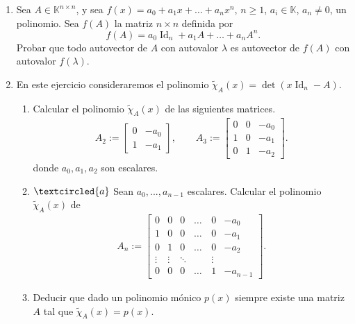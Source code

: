 \begin{enumerate}[resume,topsep=6pt,itemsep=.4cm]


\item Sea $A\in\mathbb{K}^{n\times n}$, y sea $f(x) = a_0 + a_1 x + \dots + a_nx^n$, $n \geq 1$, $a_i\in\mathbb{K}$, $a_n \neq 0$, un polinomio. Sea $f(A)$ la matriz $n \times n$ definida por
$$f(A) = a_0 \operatorname{Id}_n + a_1 A + \dots + a_n A^n.$$
Probar que todo autovector de $A$ con autovalor $\lambda$ es autovector de $f(A)$ con autovalor $f(\lambda)$.


\item\label{caracteristico-otro} {En este ejercicio consideraremos el polinomio $\tilde\chi_A(x)=\det(x\operatorname{Id}_n-A)$.}

\begin{enumerate}
\item  Calcular el polinomio $\tilde\chi_A(x)$ de las siguientes matrices.
\begin{align*}
A_2 := \begin{bmatrix} 0 & -a_0 \\ 1 & -a_1
\end{bmatrix},\quad\quad
A_3 := \begin{bmatrix} 0 & 0 & -a_0 \\ 1 & 0 & -a_1 \\ 0 & 1 & -a_2
\end{bmatrix}.
\end{align*}
donde $a_0, a_1, a_2$ son escalares.

\item\label{matriz de un polinomio} $\textcircled{a}$ Sean $a_0, ..., a_{n-1}$ escalares. Calcular el polinomio $\tilde\chi_A(x)$ de
\begin{align*}
A_n := \begin{bmatrix} 0 & 0 & 0 &\dots & 0 & -a_0 \\ 1 & 0 & 0&  \dots & 0  & -a_1 \\ 0 & 1 & 0&  \dots & 0  & -a_2 \\ \vdots & \vdots & \ddots & \quad  & \vdots\\ 0 & 0 & 0 & \dots & 1  & -a_{n-1}
\end{bmatrix}.        
 \end{align*}

 \item Deducir que dado un polinomio mónico $p(x)$ siempre existe una matriz $A$ tal que $\tilde\chi_A(x)=p(x)$.


\end{enumerate}



\end{enumerate}
